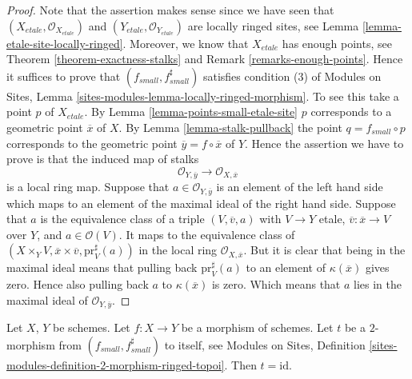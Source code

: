 \begin{proof}
Note that the assertion makes sense since we have seen that
$(X_{etale}, \mathcal{O}_{X_{etale}})$ and
$(Y_{etale}, \mathcal{O}_{Y_{etale}})$
are locally ringed sites, see
Lemma \ref{lemma-etale-site-locally-ringed}.
Moreover, we know that $X_{etale}$ has enough points, see
Theorem \ref{theorem-exactness-stalks} and
Remark \ref{remarks-enough-points}.
Hence it suffices to prove that $(f_{small}, f_{small}^\sharp)$
satisfies condition (3) of
Modules on Sites,
Lemma \ref{sites-modules-lemma-locally-ringed-morphism}.
To see this take a point $p$ of $X_{etale}$. By
Lemma \ref{lemma-points-small-etale-site}
$p$ corresponds to a geometric point $\overline{x}$ of $X$.
By
Lemma \ref{lemma-stalk-pullback}
the point $q = f_{small} \circ p$ corresponds to the
geometric point $\overline{y} = f \circ \overline{x}$ of $Y$.
Hence the assertion we have to prove is that the induced map
of stalks
$$
\mathcal{O}_{Y, \overline{y}} \longrightarrow \mathcal{O}_{X, \overline{x}}
$$
is a local ring map. Suppose that $a \in \mathcal{O}_{Y, \overline{y}}$
is an element of the left hand side which maps to an element of the maximal
ideal of the right hand side. Suppose that $a$ is the equivalence class
of a triple $(V, \overline{v}, a)$ with $V \to Y$ etale,
$\overline{v} : \overline{x} \to V$ over $Y$, and $a \in \mathcal{O}(V)$.
It maps to the equivalence class of
$(X \times_Y V, \overline{x} \times \overline{v}, \text{pr}_V^\sharp(a))$
in the local ring $\mathcal{O}_{X, \overline{x}}$. But it is clear that
being in the maximal ideal means that pulling back $\text{pr}_V^\sharp(a)$
to an element of $\kappa(\overline{x})$ gives zero. Hence also pulling back
$a$ to $\kappa(\overline{x})$ is zero. Which means that $a$ lies in the
maximal ideal of $\mathcal{O}_{Y, \overline{y}}$.
\end{proof}

\begin{lemma}
\label{lemma-2-morphism}
Let $X$, $Y$ be schemes. Let $f : X \to Y$ be a morphism of schemes.
Let $t$ be a $2$-morphism from $(f_{small}, f_{small}^\sharp)$ to itself, see
Modules on Sites,
Definition \ref{sites-modules-definition-2-morphism-ringed-topoi}.
Then $t = \text{id}$.
\end{lemma}


